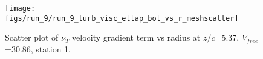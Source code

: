 \begin{figure}[H]
\centering
\texttt{[image: figs/run\_9/run\_9\_turb\_visc\_ettap\_bot\_vs\_r\_meshscatter]}
\caption{Scatter plot of $\nu_T$ velocity gradient term vs radius at $z/c$=5.37, $V_{free}$=30.86, station 1.}
\label{fig:run_9_turb_visc_ettap_bot_vs_r_meshscatter}
\end{figure}


